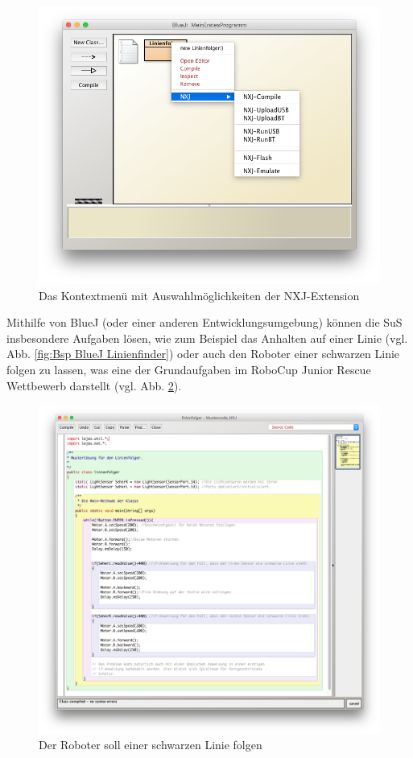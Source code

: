 \documentclass[paper=a4, DIV=14, BCOR=15mm, twoside=on, onecolumn=on, open = right, titlepage =on, parskip =half, headsepline = on, footsepline = on, chapterprefix = on, appendixprefix = off, fontsize = 12pt, numbers = noenddot, abstract = on]{scrbook}
\begin{document}
\begin{figure}[htbp]
\centering
\includegraphics[scale=0.4]{images/extension.png}
\caption{Das Kontextmenü mit Auswahlmöglichkeiten der NXJ-Extension}
\label{fig:extension}
\end{figure}

Mithilfe von BlueJ (oder einer anderen Entwicklungsumgebung) können die SuS insbesondere Aufgaben lösen, wie zum Beispiel das Anhalten auf einer Linie (vgl. Abb. \ref{fig:Bsp BlueJ Linienfinder}) oder auch den Roboter einer schwarzen Linie folgen zu lassen, was eine der Grundaufgaben im RoboCup Junior Rescue Wettbewerb darstellt (vgl. Abb. \ref{fig:Bsp BlueJ Linienfolger}).

\begin{figure}[htbp]
\centering
\includegraphics[scale=0.35]{images/linienfolger_bluej.png} 
\caption{Der Roboter soll einer schwarzen Linie folgen}
\label{fig:Bsp BlueJ Linienfolger}
\end{figure} 
\end{document}
